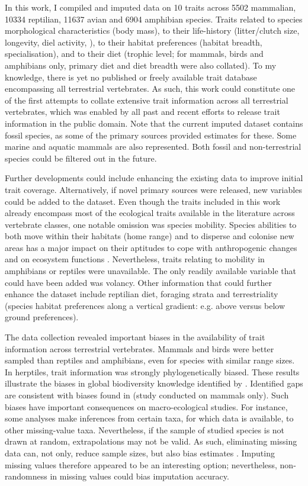 In this work, I compiled and imputed data on 10 traits across 5502 mammalian, 10334 reptilian, 11637 avian and 6904 amphibian species. Traits related to species morphological characteristics (body mass), to their life-history (litter/clutch size, longevity, diel activity, ), to their habitat preferences (habitat breadth, specialisation), and to their diet (trophic level; for mammals, birds and amphibians only, primary diet and diet breadth were also collated). To my knowledge, there is yet no published or freely available trait database encompassing all terrestrial vertebrates. As such, this work could constitute one of the first attempts to collate extensive trait information across all terrestrial vertebrates, which was enabled by all past and recent efforts to release trait information in the public domain. Note that the current imputed dataset contains fossil species, as some of the primary sources provided estimates for these. Some marine and aquatic mammals are also represented. Both fossil and non-terrestrial species could be filtered out in the future.

Further developments could include enhancing the existing data to improve initial trait coverage. Alternatively, if novel primary sources were released, new variables could be added to the dataset. Even though the traits included in this work already encompass most of the ecological traits available in the literature across vertebrate classes, one notable omission was species mobility. Species abilities to both move within their habitats (home range) and to disperse and colonise new areas has a major impact on their aptitudes to cope with anthropogenic changes and on ecosystem functions \citep{Tucker2018, Schloss2012b}. Nevertheless, traits relating to mobility in amphibians or reptiles were unavailable. The only readily available variable that could have been added was volancy. Other  information that could further enhance the dataset include reptilian diet, foraging strata and terrestriality (species habitat preferences along a vertical gradient: e.g. above versus below ground preferences).

The data collection revealed important biases in the availability of trait information across terrestrial vertebrates. Mammals and birds were better sampled than reptiles and amphibians, even for species with similar range sizes. In herptiles, trait information was strongly phylogenetically biased. These results illustrate the biases in global biodiversity knowledge identified by \citet{Hortal2014}. Identified gaps are consistent with biases found in \citet{Gonzalez-Suarez2012} (study conducted on mammals only). Such biases have important consequences on macro-ecological studies. For instance, some analyses make inferences from certain taxa, for which data is available, to other missing-value taxa. Nevertheless, if the sample of studied species is not drawn at random, extrapolations may not be valid. As such, eliminating missing data can, not only, reduce sample sizes, but also bias estimates \cite{Nakagawa2008}. Imputing missing values therefore appeared to be an interesting option; nevertheless, non-randomness in missing values could bias imputation accuracy.

